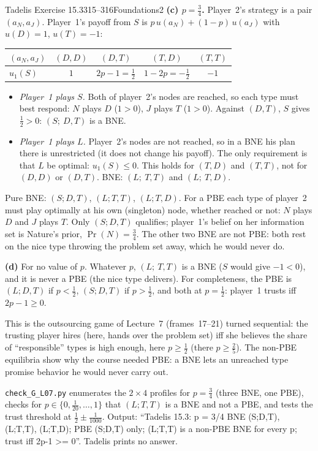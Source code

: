 \begin{exsol}{Tadelis Exercise 15.3}{315--316}{Foundations}{2}
\textbf{(c) $p = \frac34$.} Player~2's strategy is a pair $(a_N, a_J)$. Player~1's payoff from $S$ is
$p\,u(a_N) + (1-p)\,u(a_J)$ with $u(D) = 1$, $u(T) = -1$:
\begin{center}
\begin{tabular}{lcccc}
\toprule
$(a_N, a_J)$ & $(D, D)$ & $(D, T)$ & $(T, D)$ & $(T, T)$ \\
\midrule
$u_1(S)$ & $1$ & $2p - 1 = \frac12$ & $1 - 2p = -\frac12$ & $-1$ \\
\bottomrule
\end{tabular}
\end{center}
\begin{itemize}
  \item \emph{Player~1 plays $S$.} Both of player~2's nodes are reached, so each type must best respond:
  $N$ plays $D$ ($1 > 0$), $J$ plays $T$ ($1 > 0$). Against $(D, T)$, $S$ gives $\frac12 > 0$:
  $(S;\ D, T)$ is a BNE.
  \item \emph{Player~1 plays $L$.} Player~2's nodes are not reached, so in a BNE his plan there is
  unrestricted (it does not change his payoff). The only requirement is that $L$ be optimal: $u_1(S) \le 0$.
  This holds for $(T, D)$ and $(T, T)$, not for $(D, D)$ or $(D, T)$. BNE: $(L;\ T, T)$ and $(L;\ T, D)$.
\end{itemize}
Pure BNE: $(S; D, T)$, $(L; T, T)$, $(L; T, D)$. For a PBE each type of player~2 must play optimally at
his own (singleton) node, whether reached or not: $N$ plays $D$ and $J$ plays $T$. Only $(S; D, T)$
qualifies; player~1's belief on her information set is Nature's prior, $\Pr(N) = \frac34$. The other two
BNE are not PBE: both rest on the nice type throwing the problem set away, which he would never do.

\textbf{(d)} For no value of $p$. Whatever $p$, $(L;\ T, T)$ is a BNE ($S$ would give $-1 < 0$), and it is never
a PBE (the nice type delivers). For completeness, the PBE is $(L; D, T)$ if $p < \frac12$, $(S; D, T)$ if
$p > \frac12$, and both at $p = \frac12$: player~1 trusts iff $2p - 1 \ge 0$.

\interp This is the outsourcing game of Lecture~7 (frames~17--21) turned sequential: the trusting player
hires (here, hands over the problem set) iff she believes the share of ``responsible'' types is high
enough, here $p \ge \frac12$ (there $p \ge \frac25$). The non-PBE equilibria show why the course needed PBE: a
BNE lets an unreached type promise behavior he would never carry out.

\verify \texttt{check\_G\_L07.py} enumerates the $2 \times 4$ profiles for $p = \frac34$ (three BNE, one PBE),
checks for $p \in \{0, \frac1{20}, \dots, 1\}$ that $(L; T, T)$ is a BNE and not a PBE, and tests the trust
threshold at $\frac12 \pm \frac1{1000}$. Output: ``Tadelis 15.3: p = 3/4 BNE (S;D,T), (L;T,T), (L;T,D); PBE
(S;D,T) only; (L;T,T) is a non-PBE BNE for every p; trust iff 2p-1 >= 0''. Tadelis prints no answer.


\end{exsol}

